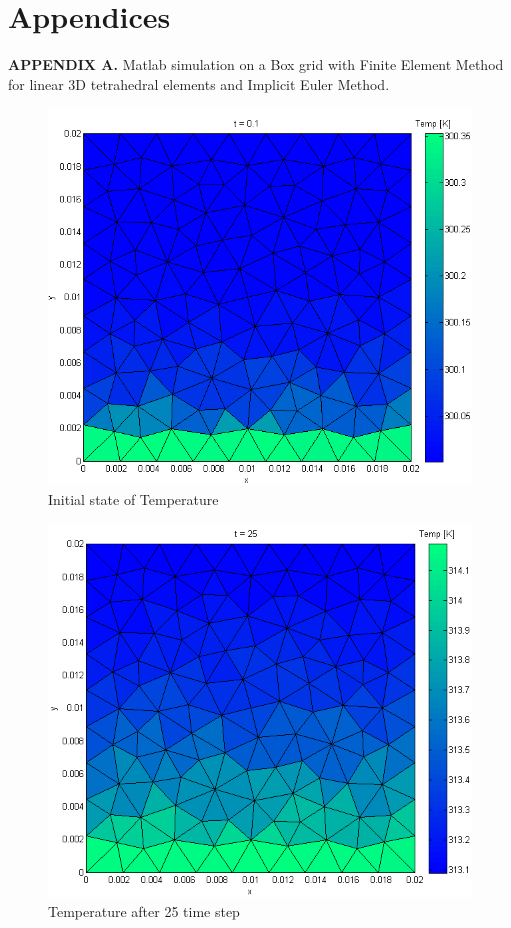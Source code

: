 \documentclass[12pt]{article}
\begin{document}
	\section{Appendices}
	
	\textbf{APPENDIX A.} Matlab simulation on a Box grid with Finite Element Method for linear 3D tetrahedral elements and Implicit Euler Method.
	
	\begin{figure}[H]
    \includegraphics[scale=0.5]{matlab-results/1.png}
    \centering
    \caption{Initial state of Temperature}
	\end{figure}	
	\begin{figure}[H]
    \includegraphics[scale=0.5]{matlab-results/2.png}
    \centering
    \caption{Temperature after 25 time step}
	\end{figure}	
\end{document}
